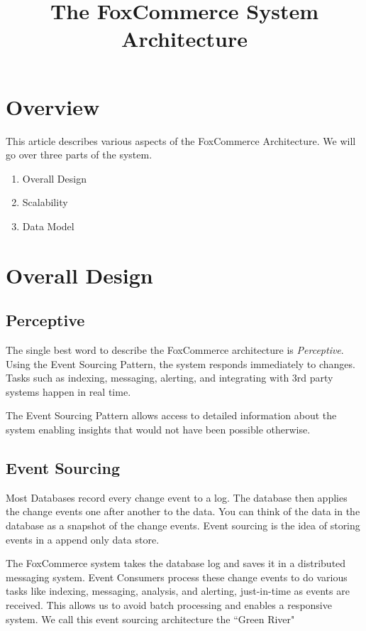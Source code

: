 \documentclass[11pt]{article}
\title{The FoxCommerce System Architecture}
\begin{document}
\maketitle
\section{Overview}

This article describes various aspects of the FoxCommerce Architecture.
We will go over three parts of the system.

\begin{enumerate}
    \item Overall Design
    \item Scalability
    \item Data Model
\end{enumerate}

\section{Overall Design}
\subsection{Perceptive}

The single best word to describe the FoxCommerce architecture is \emph{Perceptive}. 
Using the Event Sourcing Pattern, the system responds immediately to changes. 
Tasks such as indexing, messaging, alerting, and integrating with 3rd party systems
happen in real time.

The Event Sourcing Pattern allows access to detailed information about the system
enabling insights that would not have been possible otherwise.

\subsection{Event Sourcing}
Most Databases record every change event to a log. The database then applies the change 
events one after another to the data. You can think of the data in the database as a snapshot
of the change events. Event sourcing is the idea of storing
events in a append only data store.

The FoxCommerce system takes the database log and saves it in a distributed messaging system. 
Event Consumers process these change events to do various tasks like indexing, messaging, 
analysis, and alerting, just-in-time as events are received. 
This allows us to avoid batch processing and enables a responsive system.
We call this event sourcing architecture the ``Green River"
\end{document}
